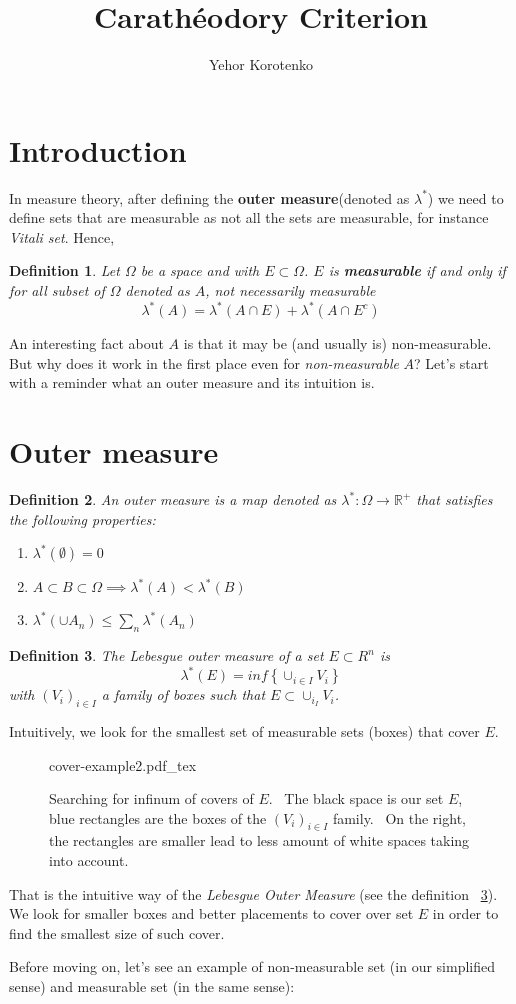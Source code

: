 \documentclass[a4paper]{article}
\author{Yehor Korotenko}
\title{Carathéodory Criterion}
\newcommand{\incfig}[1]{%
    \def\svgwidth{\columnwidth}
    {#1.pdf_tex}
}
\newcommand{\R}{\mathbb{R}}
\newtheorem{definition}{Definition}[section]
\begin{document}
\section{Introduction}
   In measure theory, after defining the \textbf{outer measure}(denoted as $\lambda^*$) we need to
   define sets that are measurable as not all the sets are measurable, for
   instance \textit{Vitali set}. Hence,
\begin{definition}
Let $\Omega$ be a space and with $E \subset \Omega$. $E$ is  \textbf{measurable} if and only if for all subset of $\Omega$ denoted as $A$, not necessarily measurable
\[
\lambda^*(A) = \lambda^*(A \cap E) + \lambda^*(A \cap E^c)
\] 
\end{definition}
An interesting fact about $A$ is that it may be (and usually is)
non-measurable. But why does it work in the first place even for
\textit{non-measurable} $A$? Let's start with a reminder what an outer measure and its intuition is.

\section{Outer measure}%
\label{sec:Outer measure}
\begin{definition}
    An outer measure is a map denoted as $\lambda^*: \Omega \to \R^+$ that satisfies the following properties:
    \begin{enumerate}
        \item $\lambda^*(\emptyset) = 0$
        \item $A \subset B \subset \Omega \implies \lambda^*(A) < \lambda^*(B)$ 
        \item $\lambda^*(\cup A_n) \le \sum_n \lambda^*(A_n)$
    \end{enumerate}
\end{definition}
\begin{definition}\label{defn:lebesgue-outer-measure}
    The Lebesgue outer measure of a set $E \subset R^n$ is 
    \[
        \lambda^*(E) = inf \left\{ \cup_{i \in I} V_i \right\}
    \] 
    with $(V_i)_{i \in I}$ a family of boxes such that $E \subset \cup_{i_I} V_i$.
\end{definition}

Intuitively, we look for the smallest set of measurable sets (boxes) that cover
$E$.  

\begin{figure}[H]
    \centering
    \incfig{cover-example2}
    \caption{Searching for infinum of covers of $E$. \
        The black space is our
        set $E$, blue rectangles are the boxes of the  $(V_i)_{i \in I}$
        family. \
        On the right, the rectangles are smaller lead to less amount of white spaces taking into account.}
    \label{fig:cover-example2}
\end{figure}

That is the intuitive way of the \textit{Lebesgue Outer Measure} (see the
definition ~\ref{defn:lebesgue-outer-measure}). We look for smaller boxes and
better placements to cover over set $E$ in order to find the smallest size of
such cover.

Before moving on, let's see an example of non-measurable set (in our simplified sense) and measurable set (in the same sense):
\end{document}
